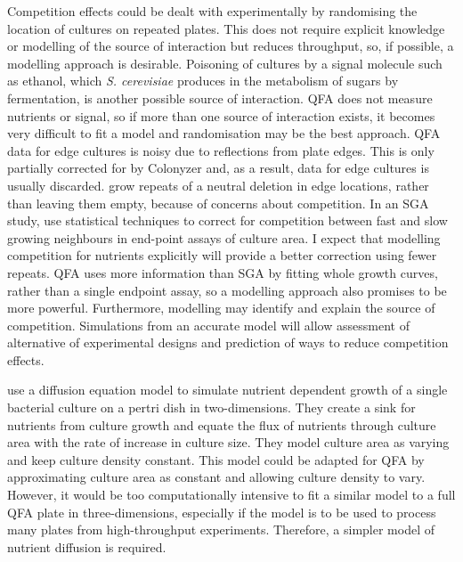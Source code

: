 Competition effects could be dealt with experimentally by randomising
the location of cultures on repeated plates. This does not require
explicit knowledge or modelling of the source of interaction but
reduces throughput, so, if possible, a modelling approach is
desirable. Poisoning of cultures by a signal molecule such as ethanol,
which \textit{S. cerevisiae} produces in the metabolism of sugars by
fermentation, is another possible source of interaction.
QFA does not measure nutrients or signal, so if more than one source
of interaction exists, it becomes very difficult to fit a model and
randomisation may be the best approach. QFA data for edge cultures is
noisy due to reflections from plate edges. This is only partially
corrected for by Colonyzer \citep{Lawless2010} and, as a result, data
for edge cultures is usually discarded. \citet{Addinall2011} grow
repeats of a neutral deletion in edge locations, rather than leaving
them empty, because of concerns about competition. In an SGA study,
\citet{Baryshnikova2010} use statistical techniques to correct for
competition between fast and slow growing neighbours in end-point
assays of culture area. I expect that modelling competition for
nutrients explicitly will provide a better correction using fewer
repeats. QFA uses more information than SGA by fitting whole growth
curves, rather than a single endpoint assay, so a modelling approach
also promises to be more powerful. Furthermore, modelling may identify
and explain the source of competition. Simulations from an accurate
model will allow assessment of alternative of experimental designs and
prediction of ways to reduce competition effects.



\citet{Reo2014} use a diffusion equation model to simulate nutrient
dependent growth of a single bacterial culture on a pertri dish in
two-dimensions. They create a sink for nutrients from culture growth
and equate the flux of nutrients through culture area with the rate of
increase in culture size. They model culture area as varying and keep
culture density constant. This model could be adapted for QFA by
approximating culture area as constant and allowing culture density to
vary. However, it would be too computationally intensive to fit a
similar model to a full QFA plate in three-dimensions, especially if
the model is to be used to process many plates from high-throughput
experiments. Therefore, a simpler model of nutrient diffusion is
required.

